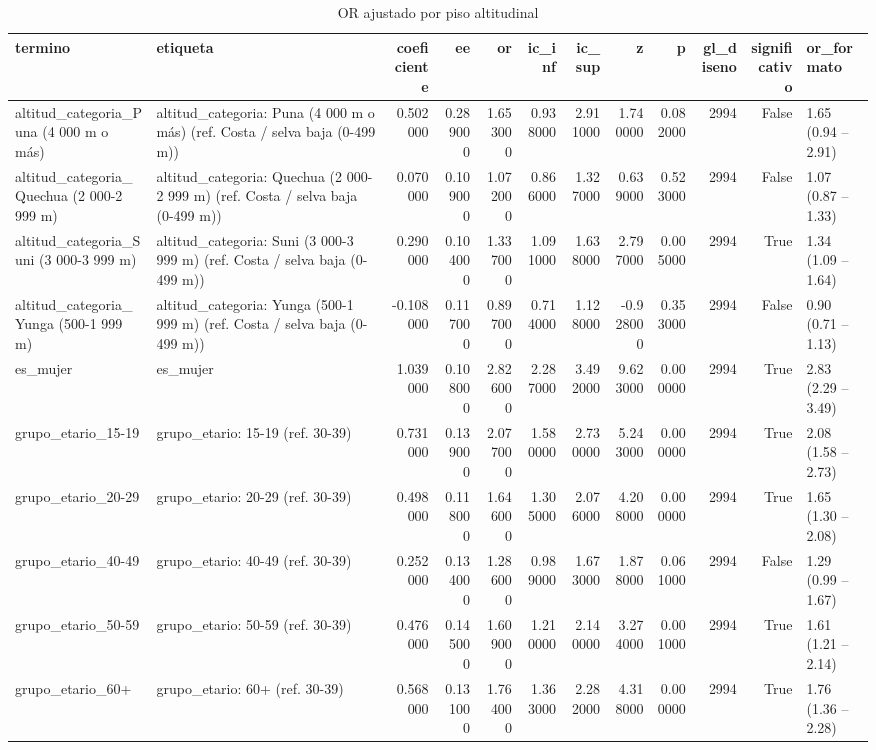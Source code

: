 \begin{table}[htbp]
\caption{OR ajustado por piso altitudinal}
\label{tab:tabla_39_altitud_categorica}
\begin{tabular}{llrrrrrrrrrl}
\toprule
termino & etiqueta & coeficiente & ee & or & ic\_inf & ic\_sup & z & p & gl\_diseno & significativo & or\_formato \\
\midrule
altitud\_categoria\_Puna (4 000 m o más) & altitud\_categoria: Puna (4 000 m o más) (ref. Costa / selva baja (0-499 m)) & 0.502000 & 0.289000 & 1.653000 & 0.938000 & 2.911000 & 1.740000 & 0.082000 & 2994 & False & 1.65 (0.94 – 2.91) \\
altitud\_categoria\_Quechua (2 000-2 999 m) & altitud\_categoria: Quechua (2 000-2 999 m) (ref. Costa / selva baja (0-499 m)) & 0.070000 & 0.109000 & 1.072000 & 0.866000 & 1.327000 & 0.639000 & 0.523000 & 2994 & False & 1.07 (0.87 – 1.33) \\
altitud\_categoria\_Suni (3 000-3 999 m) & altitud\_categoria: Suni (3 000-3 999 m) (ref. Costa / selva baja (0-499 m)) & 0.290000 & 0.104000 & 1.337000 & 1.091000 & 1.638000 & 2.797000 & 0.005000 & 2994 & True & 1.34 (1.09 – 1.64) \\
altitud\_categoria\_Yunga (500-1 999 m) & altitud\_categoria: Yunga (500-1 999 m) (ref. Costa / selva baja (0-499 m)) & -0.108000 & 0.117000 & 0.897000 & 0.714000 & 1.128000 & -0.928000 & 0.353000 & 2994 & False & 0.90 (0.71 – 1.13) \\
es\_mujer & es\_mujer & 1.039000 & 0.108000 & 2.826000 & 2.287000 & 3.492000 & 9.623000 & 0.000000 & 2994 & True & 2.83 (2.29 – 3.49) \\
grupo\_etario\_15-19 & grupo\_etario: 15-19 (ref. 30-39) & 0.731000 & 0.139000 & 2.077000 & 1.580000 & 2.730000 & 5.243000 & 0.000000 & 2994 & True & 2.08 (1.58 – 2.73) \\
grupo\_etario\_20-29 & grupo\_etario: 20-29 (ref. 30-39) & 0.498000 & 0.118000 & 1.646000 & 1.305000 & 2.076000 & 4.208000 & 0.000000 & 2994 & True & 1.65 (1.30 – 2.08) \\
grupo\_etario\_40-49 & grupo\_etario: 40-49 (ref. 30-39) & 0.252000 & 0.134000 & 1.286000 & 0.989000 & 1.673000 & 1.878000 & 0.061000 & 2994 & False & 1.29 (0.99 – 1.67) \\
grupo\_etario\_50-59 & grupo\_etario: 50-59 (ref. 30-39) & 0.476000 & 0.145000 & 1.609000 & 1.210000 & 2.140000 & 3.274000 & 0.001000 & 2994 & True & 1.61 (1.21 – 2.14) \\
grupo\_etario\_60+ & grupo\_etario: 60+ (ref. 30-39) & 0.568000 & 0.131000 & 1.764000 & 1.363000 & 2.282000 & 4.318000 & 0.000000 & 2994 & True & 1.76 (1.36 – 2.28) \\

\end{tabular}
\end{table}
